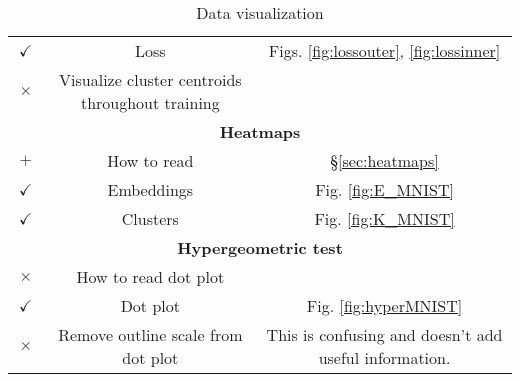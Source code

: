 \begin{table}[]
    \centering
    \begin{tabular}{cc|c}

\hline
$\boxed{\checkmark}$ & Loss &  Figs. \ref{fig:lossouter}, \ref{fig:lossinner} \\
$\boxed{\times}$ & Visualize cluster centroids throughout training &  \\
\hline
\multicolumn{3}{c}{\textbf{Heatmaps}} \\
\hline
$\boxed{+}$ & How to read &  \S \ref{sec:heatmaps} \\
$\boxed{\checkmark}$ & Embeddings &  Fig. \ref{fig:E_MNIST} \\
$\boxed{\checkmark}$ & Clusters &  Fig. \ref{fig:K_MNIST} \\
\hline
\multicolumn{3}{c}{\textbf{Hypergeometric test}} \\
\hline
$\boxed{\times}$ & How to read dot plot &  \\
$\boxed{\checkmark}$ & Dot plot &  Fig. \ref{fig:hyperMNIST} \\
$\boxed{\times}$ & Remove outline scale from dot plot & This is confusing and doesn't add useful information.\\
\hline
    \end{tabular}
    \caption{Data visualization}
    \label{tab:datavis}
\end{table}